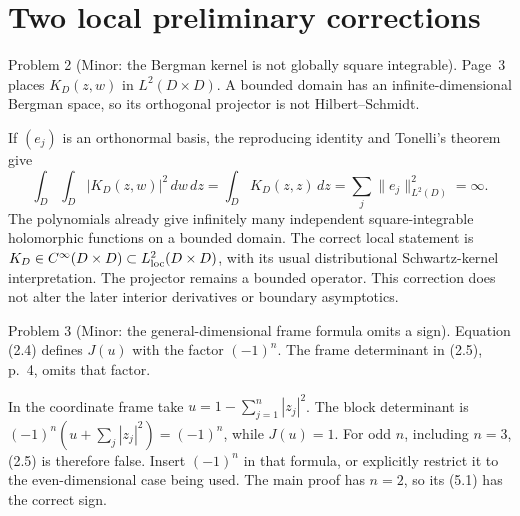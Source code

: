 \documentclass[10pt]{article}
\begin{document}
\section*{Two local preliminary corrections}
Problem 2 (Minor: the Bergman kernel is not globally square integrable).  Page 3 places \(K_D(z,w)\) in \(L^2(D\times D)\). A bounded domain has an infinite-dimensional Bergman space, so its orthogonal projector is not Hilbert–Schmidt.\par
If \((e_j)\) is an orthonormal basis, the reproducing identity and Tonelli’s theorem give \[\int_D\int_D|K_D(z,w)|^2\,dw\,dz
 =\int_D K_D(z,z)\,dz
 =\sum_j\|e_j\|_{L^2(D)}^2=\infty.\] The polynomials already give infinitely many independent square-integrable holomorphic functions on a bounded domain. The correct local statement is \(K_D\in C^\infty(D\times D)
\subset L^2_{\rm loc}(D\times D)\), with its usual distributional Schwartz-kernel interpretation. The projector remains a bounded operator. This correction does not alter the later interior derivatives or boundary asymptotics.\par
Problem 3 (Minor: the general-dimensional frame formula omits a sign).  Equation (2.4) defines \(J(u)\) with the factor \((-1)^n\). The frame determinant in (2.5), p. 4, omits that factor.\par
In the coordinate frame take \(u=1-\sum_{j=1}^n|z_j|^2\). The block determinant is \((-1)^n(u+\sum_j|z_j|^2)=(-1)^n\), while \(J(u)=1\). For odd \(n\), including \(n=3\), (2.5) is therefore false. Insert \((-1)^n\) in that formula, or explicitly restrict it to the even-dimensional case being used. The main proof has \(n=2\), so its (5.1) has the correct sign.\par
\end{document}
